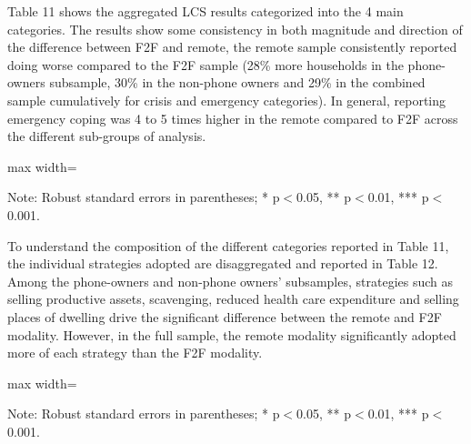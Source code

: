 \documentclass[11pt,harvard]{article}
\begin{document}
Table 11 shows the aggregated LCS results categorized into the 4 main categories. The results show some consistency in both magnitude and direction of the difference between F2F and remote, the remote sample consistently reported doing worse compared to the F2F sample (28\% more households in the phone-owners subsample, 30\%  in the non-phone owners and 29\% in the combined sample cumulatively for crisis and emergency categories). In general, reporting emergency coping was 4 to 5 times higher in the remote compared to F2F across the different sub-groups of analysis.

	\begin{table}[htbp]
		\centering
		\begin{adjustbox}{max width=\textwidth}
			\begin{threeparttable}
				\caption{Impact of Survey Modality on Livelihood Coping Strategy}
				\scriptsize
				 
				\label{tab:LCS_Modality_CAR}
				\begin{tablenotes}
					\item Note: Robust standard errors in parentheses; * p$<$0.05, ** p$<$0.01, *** p$<$0.001. 
				\end{tablenotes}
			\end{threeparttable}
		\end{adjustbox}
	\end{table}

To understand the composition of the different categories reported in Table 11, the individual strategies adopted are disaggregated and reported in Table 12. Among the phone-owners and non-phone owners' subsamples, strategies such as selling productive assets, scavenging, reduced health care expenditure and selling places of dwelling drive the significant difference between the remote and F2F modality. However, in the full sample, the remote modality significantly adopted more of each strategy than the F2F modality.

	\begin{table}[htbp]
 		\centering
		\begin{adjustbox}{max width=\textwidth}
			\begin{threeparttable}
				\caption{CAR: Each Coping Strategy Used}
				\scriptsize
				 
				\label{tab:LCS_Ind_Modality_CAR}
				\begin{tablenotes}
					\item Note: Robust standard errors in parentheses; * p$<$0.05, ** p$<$0.01, *** p$<$0.001.
				\end{tablenotes}
			\end{threeparttable}
		\end{adjustbox}
	\end{table}
	
\end{document}
